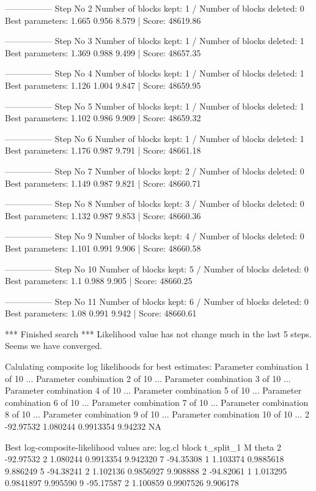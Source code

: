 \begin{Schunk}
\begin{Soutput}
----------------- 
Step No 2 
Number of blocks kept: 1  / Number of blocks deleted: 0 
Best parameters:  1.665 0.956 8.579 | Score: 48619.86 

----------------- 
Step No 3 
Number of blocks kept: 1  / Number of blocks deleted: 1 
Best parameters:  1.369 0.988 9.499 | Score: 48657.35 

----------------- 
Step No 4 
Number of blocks kept: 1  / Number of blocks deleted: 1 
Best parameters:  1.126 1.004 9.847 | Score: 48659.95 

----------------- 
Step No 5 
Number of blocks kept: 1  / Number of blocks deleted: 1 
Best parameters:  1.102 0.986 9.909 | Score: 48659.32 

----------------- 
Step No 6 
Number of blocks kept: 1  / Number of blocks deleted: 1 
Best parameters:  1.176 0.987 9.791 | Score: 48661.18 

----------------- 
Step No 7 
Number of blocks kept: 2  / Number of blocks deleted: 0 
Best parameters:  1.149 0.987 9.821 | Score: 48660.71 

----------------- 
Step No 8 
Number of blocks kept: 3  / Number of blocks deleted: 0 
Best parameters:  1.132 0.987 9.853 | Score: 48660.36 

----------------- 
Step No 9 
Number of blocks kept: 4  / Number of blocks deleted: 0 
Best parameters:  1.101 0.991 9.906 | Score: 48660.58 

----------------- 
Step No 10 
Number of blocks kept: 5  / Number of blocks deleted: 0 
Best parameters:  1.1 0.988 9.905 | Score: 48660.25 

----------------- 
Step No 11 
Number of blocks kept: 6  / Number of blocks deleted: 0 
Best parameters:  1.08 0.991 9.942 | Score: 48660.61 

*** Finished search *** 
Likelihood value has not change much in the last 5 steps. 
Seems we have converged. 

Calulating composite log likelihoods for best estimates: 
Parameter combination 1 of 10 ... 
Parameter combination 2 of 10 ... 
Parameter combination 3 of 10 ... 
Parameter combination 4 of 10 ... 
Parameter combination 5 of 10 ... 
Parameter combination 6 of 10 ... 
Parameter combination 7 of 10 ... 
Parameter combination 8 of 10 ... 
Parameter combination 9 of 10 ... 
Parameter combination 10 of 10 ... 
2	-92.97532	1.080244	0.9913354	9.94232	NA	

Best log-composite-likelihood values are: 
     log.cl block t_split_1         M    theta
2 -92.97532     2  1.080244 0.9913354 9.942320
7 -94.35308     1  1.103374 0.9885618 9.886249
5 -94.38241     2  1.102136 0.9856927 9.908888
2 -94.82061     1  1.013295 0.9841897 9.995590
9 -95.17587     2  1.100859 0.9907526 9.906178
\end{Soutput}
\end{Schunk}

